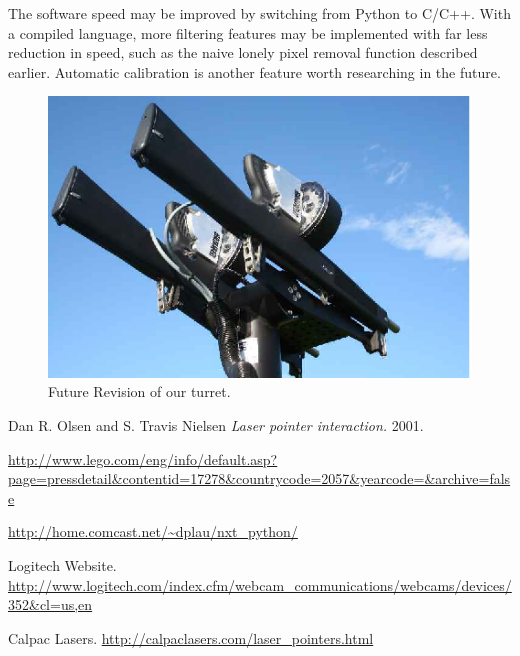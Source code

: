\documentclass[10pt,twocolumn,letterpaper]{article}
\begin{document}
The software speed may be improved by switching from Python to C/C++.  With a compiled language, more filtering features may be implemented with far less reduction in speed, such as the naive lonely pixel removal function described earlier.  Automatic calibration is another feature worth researching in the future.

\begin{figure}[t]
\begin{center}
  \includegraphics[width=0.8\linewidth]{hammer_069_a.eps}
\end{center}
   \caption{Future Revision of our turret.}
\label{fig:long}
\label{fig:onecol}
\end{figure}

\begin{thebibliography}{1}

   Dan R. Olsen and S. Travis Nielsen {\em Laser pointer interaction.} 2001. 

   \url{http://www.lego.com/eng/info/default.asp?page=pressdetail&contentid=17278&countrycode=2057&yearcode=&archive=false}

   \url{http://home.comcast.net/~dplau/nxt\_python/}
  
	 Logitech Website. \url{http://www.logitech.com/index.cfm/webcam\_communications/webcams/devices/352&cl=us,en}

   Calpac Lasers. \url{http://calpaclasers.com/laser\_pointers.html}

 \end{thebibliography}

{\small


}
\end{document}
